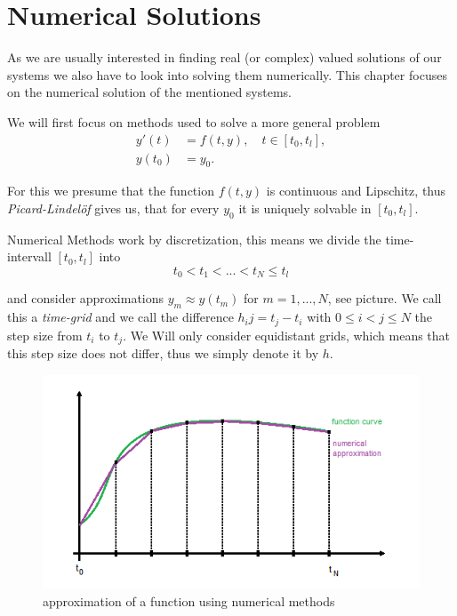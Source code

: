 \chapter{Numerical Solutions}
As we are usually interested in finding real (or complex) valued solutions of our systems we also have to look into solving them numerically. This chapter focuses on the numerical solution of the mentioned systems.

We will first focus on methods used to solve a more general problem
\begin{align}
	\label{general numerical problem}
	y'(t) &= f(t,y), \quad t \in [t_0, t_l], \\
	y(t_0) &= y_0.
\end{align}


For this we presume that the function $f(t,y)$ is continuous and Lipschitz, thus \emph{Picard-Lindelöf}  gives us, that for every $y_0$ it is uniquely solvable in $[t_0, t_l]$.

Numerical Methods work by discretization, this means we divide the time-intervall $[t_0, t_l]$ into
\begin{displaymath}
	t_0 < t_1 < ... < t_N \leq t_l
\end{displaymath}

and consider approximations $y_m \approx y(t_m)$ for $m=1,...,N$, see picture. We call this a \emph{time-grid} and we call the difference $h_ij = t_j - t_i$ with $0 \leq i < j \leq N$ the step size from $t_i$ to $t_j$. We Will only consider equidistant grids, which means that this step size does not differ, thus we simply denote it by $h$.

\begin{figure}[H]
	\label{fig:numerical approximation}
	\centering
	\includegraphics[scale=0.7]{pictures/num_approx.png}
	\caption{approximation of a function using numerical methods}
\end{figure}

